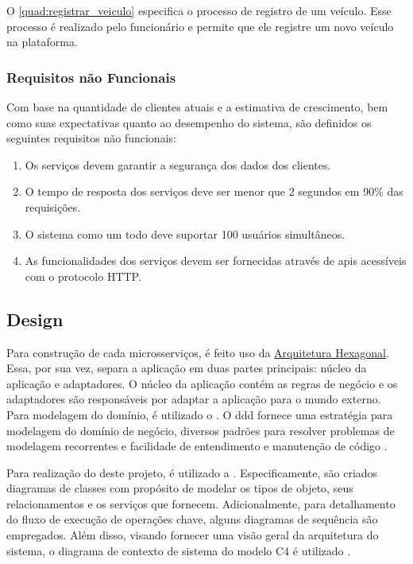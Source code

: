 O \autoref{quad:registrar_veiculo} especifica o processo de registro de um veículo. Esse processo é realizado pelo funcionário e permite que ele registre um novo veículo na plataforma.

\subsubsection{Requisitos não Funcionais}
Com base na quantidade de clientes atuais e a estimativa de crescimento, bem como suas expectativas quanto ao desempenho do sistema, são definidos os seguintes requisitos não funcionais:
\begin{enumerate}
    \item Os serviços devem garantir a segurança dos dados dos clientes.
    \item O tempo de resposta dos serviços deve ser menor que 2 segundos em 90\% das requisições.
    \item O sistema como um todo deve suportar 100 usuários simultâneos.
    \item As funcionalidades dos serviços devem ser fornecidas através de \acrshort{api}s acessíveis com o protocolo HTTP.
\end{enumerate}

\subsection{Design}
Para construção de cada microsserviços, é feito uso da \hyperref[section:hexagonal]{Arquitetura Hexagonal}. Essa, por sua vez, separa a aplicação em duas partes principais: núcleo da aplicação e adaptadores. O núcleo da aplicação contém as regras de negócio e os adaptadores são responsáveis por adaptar a aplicação para o mundo externo. Para modelagem do domínio, é utilizado o . O \acrshort{ddd} fornece uma estratégia para modelagem do domínio de negócio, diversos padrões para resolver problemas de modelagem recorrentes e facilidade de entendimento e manutenção de código \cite{evans2004ddd}.

Para realização do  deste projeto, é utilizado a . Especificamente, são criados diagramas de classes com propósito de modelar os tipos de objeto, seus relacionamentos e os serviços que fornecem. Adicionalmente, para detalhamento do fluxo de execução de operações chave, alguns diagramas de sequência são empregados. Além disso, visando fornecer uma visão geral da arquitetura do sistema, o diagrama de contexto de sistema do modelo C4 é utilizado \cite{c4Model}. 


